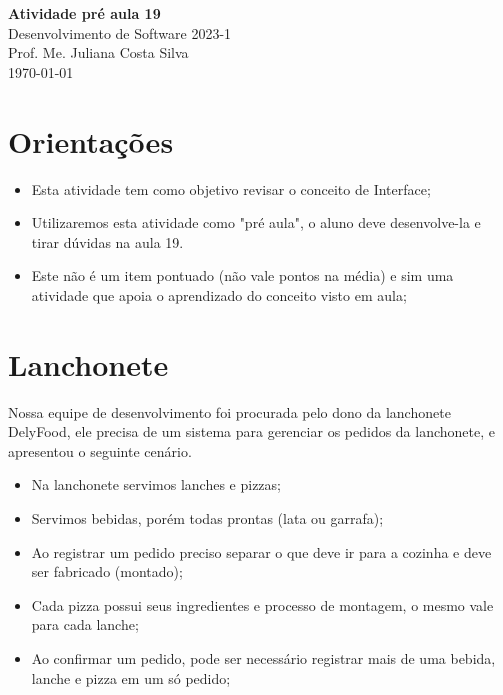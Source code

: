 \documentclass[12pt,a4paper, brazil]{article}
\begin{document}
\begin{center}
{\textbf {\huge Atividade pré aula 19}}\\[5mm]
{\large Desenvolvimento de Software 2023-1} \\
{\large Prof. Me. Juliana Costa Silva} \\
\today\\[5mm] %
\end{center}

\section*{Orientações}

\begin{itemize}
  \item Esta atividade tem como objetivo revisar o conceito de Interface;
  \item Utilizaremos esta atividade como "pré aula", o aluno deve desenvolve-la e tirar dúvidas na aula 19.
  \item Este não é um item pontuado (não vale pontos na média) e sim uma atividade que apoia o aprendizado do conceito visto em aula;
\end{itemize}


\vspace{0.5cm}


\section{Lanchonete}
\par

Nossa equipe de desenvolvimento foi procurada pelo dono da lanchonete DelyFood, ele precisa de um sistema para gerenciar os pedidos da lanchonete, e apresentou o seguinte cenário.
\begin{itemize}
    \item Na lanchonete servimos lanches e pizzas;
    \item Servimos bebidas, porém todas prontas (lata ou garrafa);
    \item Ao registrar um pedido preciso separar o que deve ir para a cozinha e deve ser fabricado (montado);
    \item Cada pizza possui seus ingredientes e processo de montagem, o mesmo vale para cada lanche;
    \item Ao confirmar um pedido, pode ser necessário registrar mais de uma bebida, lanche e pizza em um só pedido;
\end{itemize}
\end{document}
